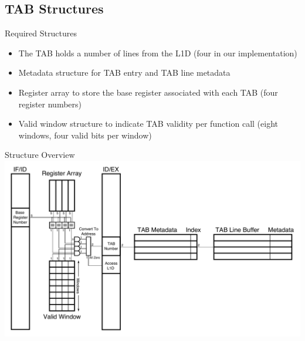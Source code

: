 \documentclass{beamer}
\begin{document}
\subsection{TAB Structures}
\begin{frame}{Required Structures}
   \begin{itemize}
      \item The TAB holds a number of lines from the L1D 
         (four in our implementation)
      \item Metadata structure for TAB entry and TAB line metadata
      \item Register array to store the base register associated with
         each TAB (four register numbers)
      \item Valid window structure to indicate TAB validity per function call
         (eight windows, four valid bits per window)
   \end{itemize}
\end{frame}
\begin{frame}{Structure Overview}
   \includegraphics[width=\textwidth]{figures/tabhardware.pdf}
\end{frame}
\end{document}
